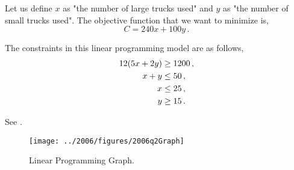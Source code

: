%
%

\begin{subquestions}
	

\subquestion

Let us define $x$ as "the number of large trucks used" and $y$ as "the number of small trucks used". The objective function that we want to minimize is,
\begin{equation}
	C = 240x + 100y \,.
\end{equation}

The constraints in this linear programming model are as follows,
\begin{align}
	12(5x + 2y) & \geq 1200 \,, \nonumber \\
	x + y & \leq 50 \,, \nonumber \\
	x & \leq 25 \,, \nonumber \\
	y & \geq 15 \,. 
\end{align}


\subquestion

\begin{subsubquestions}

	
\subsubquestion

See . 

\begin{figure}
	\begin{center}
		\texttt{[image: ../2006/figures/2006q2Graph]}
		\caption{\label{2006:q2:fig:Graph} Linear Programming Graph.}
	\end{center}
\end{figure}


\end{subsubquestions}
\end{subquestions}
